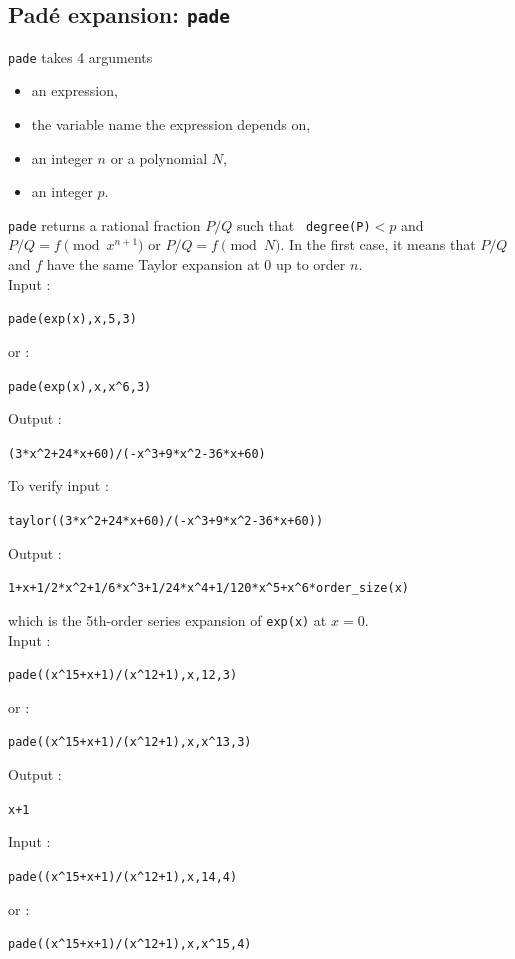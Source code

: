 \documentclass[a4paper,11pt]{book}
\begin{document}
\subsection{Pad\'e expansion: {\tt pade}}
{\tt pade} takes 4 arguments
\begin{itemize}
\item an expression, 
\item the variable name the expression depends on,
\item an integer $n$ or a polynomial $N$,
\item an integer $p$.
\end{itemize}
{\tt pade} returns a rational fraction  $P/Q$ such that {\tt
  degree(P)}$<p$ and $P/Q=f \pmod{x^{n+1}}$ or $P/Q=f \pmod{N}$.
In the first case, it means that $P/Q$ and $f$ have the same 
Taylor expansion at 0 up to order $n$.\\ 
Input :
\begin{center}{\tt pade(exp(x),x,5,3)}\end{center}
or :
\begin{center}{\tt pade(exp(x),x,x\verb|^|6,3)}\end{center}
Output :
\begin{center}{\tt (3*x\verb|^|2+24*x+60)/(-x\verb|^|3+9*x\verb|^|2-36*x+60)}\end{center}
To verify input :
\begin{center}{\tt taylor((3*x\verb|^|2+24*x+60)/(-x\verb|^|3+9*x\verb|^|2-36*x+60))}\end{center}
Output :
\begin{center}{\tt 1+x+1/2*x\verb|^|2+1/6*x\verb|^|3+1/24*x\verb|^|4+1/120*x\verb|^|5+x\verb|^|6*order\_size(x)}\end{center}
which is the 5th-order series expansion of {\tt exp(x)} at $x=0$.\\
Input :
\begin{center}{\tt pade((x\verb|^|15+x+1)/(x\verb|^|12+1),x,12,3)}\end{center}
or :
\begin{center}{\tt pade((x\verb|^|15+x+1)/(x\verb|^|12+1),x,x\verb|^|13,3)}\end{center}
Output :
\begin{center}{\tt x+1}\end{center}
Input :
\begin{center}{\tt pade((x\verb|^|15+x+1)/(x\verb|^|12+1),x,14,4)}\end{center}
or :
\begin{center}{\tt pade((x\verb|^|15+x+1)/(x\verb|^|12+1),x,x\verb|^|15,4)}\end{center}
\end{document}
